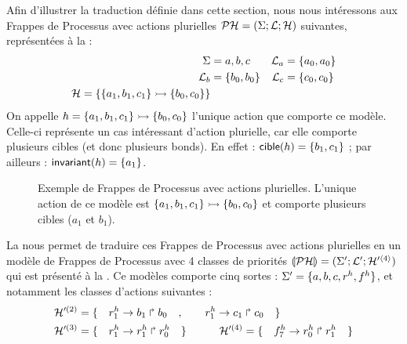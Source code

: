 \begin{example}
  Afin d'illustrer la traduction définie dans cette section,
  nous nous intéressons aux Frappes de Processus avec actions plurielles
  $\mathcal{PH} = (\Sigma; \mathcal{L}; \mathcal{H})$ suivantes,
  représentées à la  :
  \begin{align*}
    \Sigma &= {a, b, c} & \mathcal{L}_a &= \{ a_0, a_0\} \\
    \mathcal{L}_b &= \{ b_0, b_0 \} & \mathcal{L}_c &= \{ c_0, c_0\} \\
    \mathcal{H} = \{ \mbox{$\{a_1, b_1, c_1\} \rightarrowtail \{b_0, c_0\}$} \}
  \end{align*}
  On appelle $h = \mbox{$\{a_1, b_1, c_1\} \rightarrowtail \{b_0, c_0\}$}$
  l'unique action que comporte ce modèle.
  Celle-ci représente un cas intéressant d'action plurielle,
  car elle comporte plusieurs cibles (et donc plusieurs bonds).
  En effet : $\mathsf{cible}(h) = \{ b_1, c_1 \}$ ;
  par ailleurs : $\mathsf{invariant}(h) = \{ a_1 \}$.
  
  \begin{figure}[ht]
  \begin{center}
  \caption{%
    Exemple de Frappes de Processus avec actions plurielles.
    L'unique action de ce modèle est $\mbox{$\{a_1, b_1, c_1\} \rightarrowtail \{b_0, c_0\}$}$
    et comporte plusieurs cibles ($a_1$ et $b_1$).
  }
  \end{center}
  \end{figure}
  
  La  nous permet de traduire ces Frappes de Processus avec actions plurielles
  en un modèle de Frappes de Processus avec 4 classes de priorités
  $\llparenthesis \mathcal{PH} \rrparenthesis = (\Sigma'; \mathcal{L}'; \mathcal{H}'^{\langle 4 \rangle})$
  qui est présenté à la .
  Ce modèles comporte cinq sortes :
  $\Sigma' = \{ a, b, c, r^{h}, f^{h} \}$,
  et notamment les classes d'actions suivantes :
  \begin{align*}
    \mathcal{H}'^{(2)} &= \{\quad r^{h}_1\rightarrow b_1\Rsh b_0 \quad,
      \qquad r^{h}_1\rightarrow c_1\Rsh c_0 \quad\} \\
    \mathcal{H}'^{(3)} &= \{\quad r^{h}_1\rightarrow r^{h}_1\Rsh r^{h}_0 \quad\} \qquad\quad
      \mathcal{H}'^{(4)} = \{\quad f^{h}_7\rightarrow r^{h}_0\Rsh r^{h}_1 \quad\}
  \end{align*}
  

\end{example}
